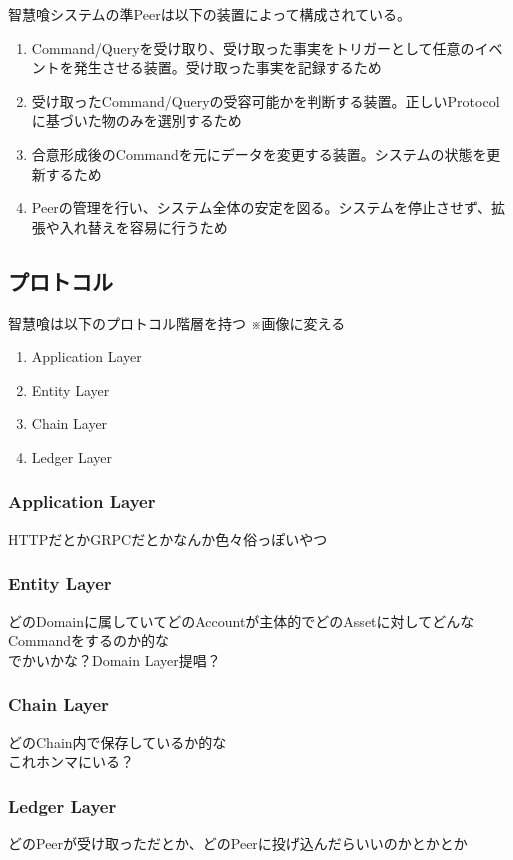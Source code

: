 \documentclass[10pt,a4paper]{jarticle}
\begin{document}
\begin{multicols}{2}
智慧喰システムの準Peerは以下の装置によって構成されている。
\begin{enumerate}
  \item Command/Queryを受け取り、受け取った事実をトリガーとして任意のイベントを発生させる装置。受け取った事実を記録するため
  \item 受け取ったCommand/Queryの受容可能かを判断する装置。正しいProtocolに基づいた物のみを選別するため
  \item 合意形成後のCommandを元にデータを変更する装置。システムの状態を更新するため
  \item Peerの管理を行い、システム全体の安定を図る。システムを停止させず、拡張や入れ替えを容易に行うため  
\end{enumerate}

\subsection{プロトコル}
智慧喰は以下のプロトコル階層を持つ
※画像に変える
\begin{enumerate}
  \item Application Layer
  \item Entity Layer
  \item Chain Layer
  \item Ledger Layer
\end{enumerate}

\subsubsection{Application Layer}
HTTPだとかGRPCだとかなんか色々俗っぽいやつ

\subsubsection{Entity Layer}
どのDomainに属していてどのAccountが主体的でどのAssetに対してどんなCommandをするのか的な\\
でかいかな？Domain Layer提唱？


\subsubsection{Chain Layer}
どのChain内で保存しているか的な\\ 
これホンマにいる？

\subsubsection{Ledger Layer}
どのPeerが受け取っただとか、どのPeerに投げ込んだらいいのかとかとか


\end{multicols}
\end{document}
